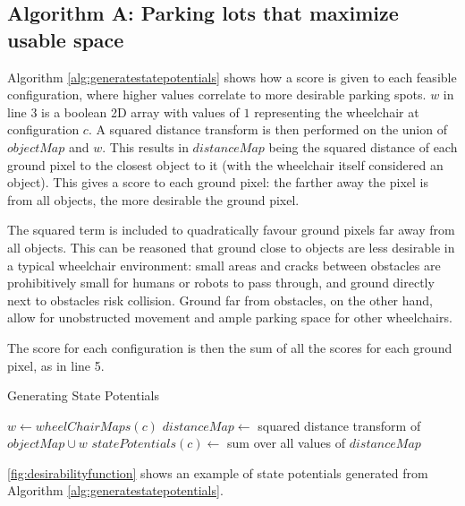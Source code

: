 \subsection{Algorithm A: Parking lots that maximize usable space}
Algorithm \autoref{alg:generatestatepotentials} shows how a score is given to each
feasible configuration, where higher values correlate to more desirable parking
spots. $w$ in line 3 is a boolean 2D array with values of $1$ representing the
wheelchair at configuration $c$. A squared distance transform is then performed
on the union of $objectMap$ and $w$. This results in $distanceMap$ being the
squared distance of each ground pixel to the closest object to it (with the
wheelchair itself considered an object). This gives a score to each ground pixel:
the farther away the pixel is from all objects, the more desirable the ground
pixel. 

The squared term is included to quadratically favour ground pixels far
away from all objects. This can be reasoned that ground close to objects are less
desirable in a typical wheelchair environment: small areas and cracks between
obstacles are prohibitively small for humans or robots to pass through, and
ground directly next to obstacles risk collision. Ground far from obstacles, on
the other hand, allow for unobstructed movement and ample parking space for
other wheelchairs.

The score for each configuration is then the sum of all the scores for each
ground pixel, as in line 5.

\begin{algorithm}
\caption{Generating State Potentials}
\label{alg:generatestatepotentials}
\begin{algorithmic}[1]
\Statex
{}
        \State $w \gets wheelChairMaps(c)$
        \State $distanceMap \gets$ squared distance transform of $objectMap \cup w$
        \State $statePotentials(c) \gets$ sum over all values of $distanceMap$
    \EndFor
\EndFunction
\Statex
{}
\end{algorithmic}
\end{algorithm}

\autoref{fig:desirabilityfunction} shows an example of state potentials
generated from Algorithm \autoref{alg:generatestatepotentials}.

